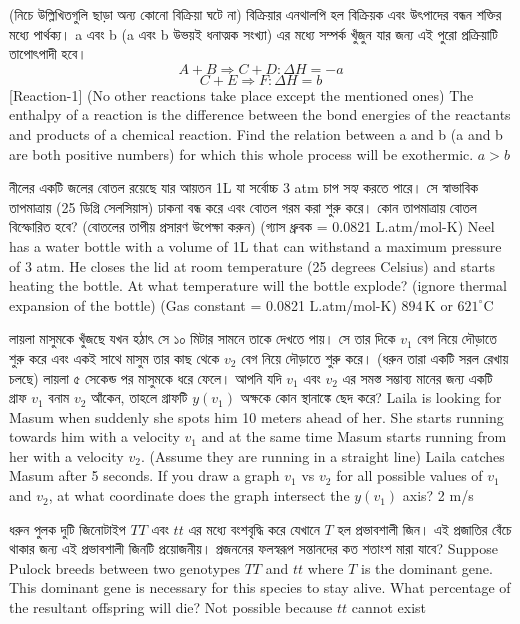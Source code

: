 \documentclass[article, 12pt, a4paper, onesize]{memoir}
\begin{document}
\begin{Problems}
    \problem
    {
    (নিচে উল্লিখিতগুলি ছাড়া অন্য কোনো বিক্রিয়া ঘটে না) বিক্রিয়ার এনথালপি হল বিক্রিয়ক এবং উৎপাদের বন্ধন শক্তির মধ্যে পার্থক্য। a এবং b (a এবং b উভয়ই ধনাত্মক সংখ্যা) এর মধ্যে সম্পর্ক খুঁজুন যার জন্য এই পুরো প্রক্রিয়াটি তাপোৎপাদী হবে।}
    {$$A+B \Rightarrow C+D: \Delta H = -a$$
    $$C+E \Rightarrow F: \Delta H = b$$
    [Reaction-1] (No other reactions take place except the mentioned ones) The enthalpy of a reaction is the difference between the bond energies of the reactants and products of a chemical reaction. Find the relation between a and b (a and b are both positive numbers) for which this whole process will be exothermic.}
    {}
    {$a > b$}

    \problem
    {নীলের একটি জলের বোতল রয়েছে যার আয়তন 1L যা সর্বোচ্চ 3 atm চাপ সহ্য করতে পারে। সে স্বাভাবিক তাপমাত্রায় (25 ডিগ্রি সেলসিয়াস) ঢাকনা বন্ধ করে এবং বোতল গরম করা শুরু করে। কোন তাপমাত্রায় বোতল বিস্ফোরিত হবে? (বোতলের তাপীয় প্রসারণ উপেক্ষা করুন) (গ্যাস ধ্রুবক = 0.0821 L.atm/mol-K)}
    {Neel has a water bottle with a volume of 1L that can withstand a maximum pressure of 3 atm. He closes the lid at room temperature (25 degrees Celsius) and starts heating the bottle. At what temperature will the bottle explode? (ignore thermal expansion of the bottle) (Gas constant = 0.0821 L.atm/mol-K)}
    {}
    {$894 \, \mathrm{K}$ or $621^\circ \mathrm{C}$}

    \problem
    {লায়লা মাসুমকে খুঁজছে যখন হঠাৎ সে ১০ মিটার সামনে তাকে দেখতে পায়। সে তার দিকে $v_1$ বেগ নিয়ে দৌড়াতে শুরু করে এবং একই সাথে মাসুম তার কাছ থেকে $v_2$ বেগ নিয়ে দৌড়াতে শুরু করে। (ধরুন তারা একটি সরল রেখায় চলছে) লায়লা ৫ সেকেন্ড পর মাসুমকে ধরে ফেলে। আপনি যদি $v_1$ এবং $v_2$ এর সমস্ত সম্ভাব্য মানের জন্য একটি গ্রাফ $v_1$ বনাম $v_2$ আঁকেন, তাহলে গ্রাফটি $y(v_1)$ অক্ষকে কোন স্থানাঙ্কে ছেদ করে?}
    {Laila is looking for Masum when suddenly she spots him 10 meters ahead of her. She starts running towards him with a velocity $v_1$ and at the same time Masum starts running from her with a velocity $v_2$. (Assume they are running in a straight line) Laila catches Masum after 5 seconds. If you draw a graph $v_1$ vs $v_2$ for all possible values of $v_1$ and $v_2$, at what coordinate does the graph intersect the $y(v_1)$ axis?}
    {}
    {2 m/s}

    \problem
    {ধরুন পুলক দুটি জিনোটাইপ $TT$ এবং $tt$ এর মধ্যে বংশবৃদ্ধি করে যেখানে $T$ হল প্রভাবশালী জিন। এই প্রজাতির বেঁচে থাকার জন্য এই প্রভাবশালী জিনটি প্রয়োজনীয়। প্রজননের ফলস্বরূপ সন্তানদের কত শতাংশ মারা যাবে?}
    {Suppose Pulock breeds between two genotypes $TT$ and $tt$ where $T$ is the dominant gene. This dominant gene is necessary for this species to stay alive. What percentage of the resultant offspring will die?}
    {}
    {Not possible because $tt$ cannot exist}


\end{Problems}
\end{document}
